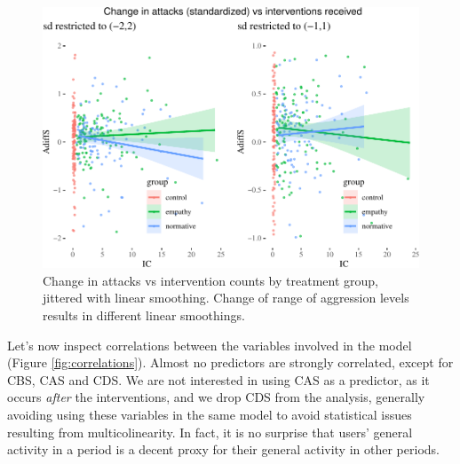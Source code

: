\documentclass[
  10pt,
  dvipsnames, enabledeprecatedfontcommands]{scrartcl}
\begin{document}
\begin{figure}

\begin{center}\includegraphics[width=1\linewidth]{technicalReport4_files/figure-latex/fig:linearShift-1} \end{center}
\caption{Change in attacks vs intervention counts by treatment group, jittered with  linear smoothing. Change of range of aggression levels results in different linear smoothings.}
\label{fig:linearShift}
\end{figure}

Let's now inspect correlations between the variables involved in the
model (Figure \ref{fig:correlations}). Almost no predictors are strongly
correlated, except for \textsf{CBS}, \textsf{CAS} and \textsf{CDS}. We
are not interested in using \textsf{CAS} as a predictor, as it occurs
\emph{after} the interventions, and we drop \textsf{CDS} from the
analysis, generally avoiding using these variables in the same model to
avoid statistical issues resulting from multicolinearity. In fact, it is
no surprise that users' general activity in a period is a decent proxy
for their general activity in other periods.
\end{document}
